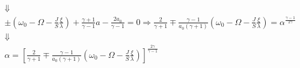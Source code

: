 \begin{equation}
\begin{array}{c}
 \Downarrow \\
 \pm \left( {{\omega _0} - \Omega  - \frac{J}{S}\frac{\xi }{\lambda }} \right) + \frac{{\gamma  + 1}}{{\gamma  - 1}}a - \frac{{2{a_0}}}{{\gamma  - 1}} = 0 \Rightarrow \frac{2}{{\gamma  + 1}} \mp \frac{{\gamma  - 1}}{{{a_0}\left( {\gamma  + 1} \right)}}\left( {{\omega _0} - \Omega  - \frac{J}{S}\frac{\xi }{\lambda }} \right) = {\alpha ^{\frac{{\gamma  - 1}}{{2\gamma }}}}\\
 \Downarrow \\
\alpha  = {\left[ {\frac{2}{{\gamma  + 1}} \mp \frac{{\gamma  - 1}}{{{a_0}\left( {\gamma  + 1} \right)}}\left( {{\omega _0} - \Omega  - \frac{J}{S}\frac{\xi }{\lambda }} \right)} \right]^{\frac{{2\gamma }}{{\gamma  - 1}}}}
\end{array}
\end{equation}


